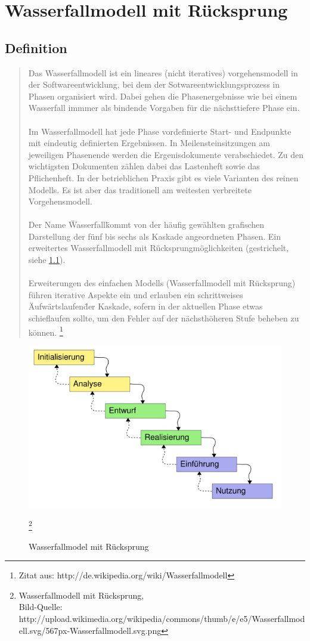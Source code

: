 \chapter{Wasserfallmodell mit Rücksprung}
\section{Definition}
\begin{quote}
Das Wasserfallmodell ist ein lineares (nicht iteratives) vorgehensmodell in der Softwareentwicklung, bei dem der
 Sotwareentwicklungsprozess in Phasen organisiert wird. Dabei gehen die Phasenergebnisse wie bei einem Wasserfall immmer
als bindende Vorgaben für die nächsttiefere Phase ein.\ \\ \\
Im Wasserfallmodell hat jede Phase vordefinierte Start- und Endpunkte mit eindeutig definierten Ergebnissen.
In Meilensteinsitzungen am jeweiligen Phasenende werden die Ergenisdokumente verabschiedet. Zu den wichtigsten
Dokumenten zählen dabei das Lastenheft sowie das Pflichenheft. In der betrieblichen Praxis gibt es viele Varianten
des reinen Modells. Es ist aber das traditionell am weitesten verbreitete Vorgehensmodell.\ \\ \\
Der Name \"Wasserfall\" kommt von der häufig gewählten grafischen Darstellung der fünf bis sechs als Kaskade
angeordneten Phasen. Ein erweitertes Wasserfallmodell mit Rücksprungmöglichkeiten (gestrichelt, siehe \ref{w_model}).\ \\ \\
Erweiterungen des einfachen Modells (Wasserfallmodell mit Rücksprung) führen iterative Aspekte ein und erlauben
ein schrittweises \"Aufwärtslaufen\" der Kaskade, sofern in der aktuellen Phase etwas schieflaufen sollte,
um den Fehler auf der nächsthöheren Stufe beheben zu können.
\footnote{Zitat aus:  http://de.wikipedia.org/wiki/Wasserfallmodell}
\end{quote}
\begin{figure}[h]
\centering
\includegraphics[scale=0.35]{567px-Wasserfallmodell.png}
\caption{Wasserfallmodel mit Rücksprung}
\footnote{Wasserfallmodell mit Rücksprung, \\ Bild-Quelle: http://upload.wikimedia.org/wikipedia/commons/thumb/e/e5/Wasserfallmodell.svg/567px-Wasserfallmodell.svg.png}
\label{w_model}
\end{figure}

